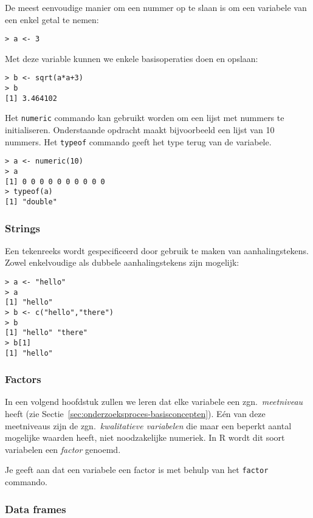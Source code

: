 De meest eenvoudige manier om een nummer op te slaan is om een variabele van een enkel getal te nemen:

\begin{lstlisting}
> a <- 3
\end{lstlisting}

Met deze variable kunnen we enkele basisoperaties doen en opslaan:

\begin{lstlisting}
> b <- sqrt(a*a+3)
> b
[1] 3.464102
\end{lstlisting}

Het \texttt{numeric} commando kan gebruikt worden om een lijst met nummers te initialiseren. Onderstaande opdracht maakt bijvoorbeeld een lijst van 10 nummers. Het \texttt{typeof} commando geeft het type terug van de variabele.

\begin{lstlisting}
> a <- numeric(10)
> a
[1] 0 0 0 0 0 0 0 0 0 0
> typeof(a)
[1] "double"
\end{lstlisting}

\subsubsection{Strings}

Een tekenreeks wordt gespecificeerd door gebruik te maken van aanhalingstekens. Zowel enkelvoudige als dubbele aanhalingstekens zijn mogelijk:

\begin{lstlisting}
> a <- "hello"
> a
[1] "hello"
> b <- c("hello","there")
> b
[1] "hello" "there"
> b[1]
[1] "hello"
\end{lstlisting}

\subsubsection{Factors}

In een volgend hoofdstuk zullen we leren dat elke variabele een zgn.~\textit{meetniveau} heeft (zie Sectie~\ref{sec:onderzoeksproces-basisconcepten}). Eén van deze meetniveaus zijn de zgn.~\textit{kwalitatieve variabelen} die maar een beperkt aantal mogelijke waarden heeft, niet noodzakelijke numeriek. In R wordt dit soort variabelen een \textit{factor} genoemd.

Je geeft aan dat een variabele een factor is met behulp van het \texttt{factor} commando. 

\subsubsection{Data frames}

